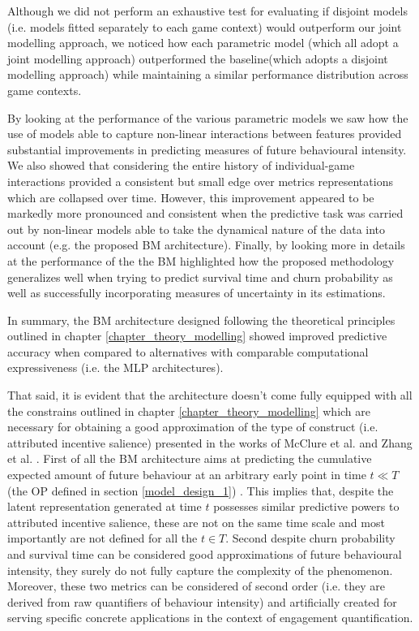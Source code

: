 Although we did not perform an exhaustive test for evaluating if disjoint models (i.e. models fitted separately to each game context) would outperform our joint modelling approach, we noticed how each parametric model (which all adopt a joint modelling approach) outperformed the baseline(which adopts a disjoint modelling approach) while maintaining a similar performance distribution across game contexts. 

By looking at the performance of the various parametric models we saw how  the use of models able to capture non-linear interactions between features provided substantial improvements in predicting measures of future behavioural intensity. We also showed that considering the entire history of individual-game interactions provided a consistent but small edge over metrics representations which are collapsed over time. However, this improvement appeared to be markedly more pronounced and consistent when the predictive task was carried out by non-linear models able to take the dynamical nature of the data into account (e.g. the proposed BM architecture). Finally, by looking more in details at the performance of the the BM highlighted how the proposed methodology generalizes well when trying to predict survival time and churn probability as well as successfully incorporating measures of uncertainty in its estimations. 

In summary, the BM architecture designed following the theoretical principles outlined in chapter \ref{chapter_theory_modelling} showed improved predictive accuracy when compared to alternatives with comparable computational expressiveness (i.e. the MLP architectures). 

That said, it is evident that the architecture doesn't come fully equipped with all the constrains outlined in chapter \ref{chapter_theory_modelling}
which are necessary for obtaining a good approximation of the type of construct (i.e. attributed incentive salience) presented in the works of McClure et al. \cite{mcclure2003computational} and Zhang et al. \cite{zhang2009neural}. First of all the BM architecture aims at predicting the cumulative expected amount of future behaviour at an arbitrary early point in time $t \ll T$ (the OP defined in section \ref{model_design_1}) . This implies that, despite the latent representation generated at time $t$ possesses similar predictive powers to attributed incentive salience, these are not on the same time scale and most importantly are not defined for all the $t \in T$. Second despite churn probability and survival time can be considered good approximations of future behavioural intensity, they surely do not fully capture the complexity of the phenomenon. Moreover, these two metrics can be considered of second order (i.e. they are derived from raw quantifiers of behaviour intensity) and artificially created for serving specific concrete applications in the context of engagement quantification. 

